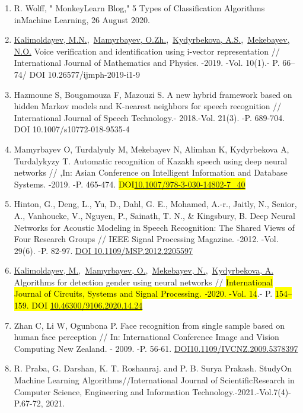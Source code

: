 \begin{enumerate}
\def\labelenumi{\arabic{enumi}.}
\setcounter{enumi}{2}
\item
  R. Wolff, " MonkeyLearn Blog," 5 Types of Classification Algorithms
  inMachine Learning, 26 August 2020.
\item
  \href{https://www.scopus.com/authid/detail.uri?authorId=56153126500}{Kalimoldayev,
  M.N.},~\href{https://www.scopus.com/authid/detail.uri?authorId=55967630400}{Mamyrbayev,
  O.Zh.},~\href{https://www.scopus.com/authid/detail.uri?authorId=57208346238}{Kydyrbekova,
  A.S.},~\href{https://www.scopus.com/authid/detail.uri?authorId=57202316868}{Mekebayev,
  N.O.} Voice verification and identification using i-vector
  representation // International Journal of Mathematics and Physics.
  -2019. -Vol. 10(1).- P. 66--74/ DOI 10.26577/ijmph-2019-i1-9
\item
  Hazmoune S, Bougamouza F, Mazouzi S. A new hybrid framework based on
  hidden Markov models and K-nearest neighbors for speech recognition //
  International Journal of Speech Technology.- 2018.-Vol. 21(3). -P.
  689-704. DOI 10.1007/s10772-018-9535-4
\item
  Mamyrbayev O, Turdalyuly M, Mekebayev N, Alimhan K, Kydyrbekova A,
  Turdalykyzy T. Automatic recognition of Kazakh speech using deep
  neural networks // ,In: Asian Conference on Intelligent Information
  and Database Systems. -2019. -P. 465-474.
  \hl{DOI\href{http://dx.doi.org/10.1007/978-3-030-14802-7_40}{10.1007/978-3-030-14802-7\_40}}
\item
  Hinton, G., Deng, L., Yu, D., Dahl, G. E., Mohamed, A.-r., Jaitly, N.,
  Senior, A., Vanhoucke, V., Nguyen, P., Sainath, T. N., \& Kingsbury,
  B. Deep Neural Networks for Acoustic Modeling in Speech Recognition:
  The Shared Views of Four Research Groups // IEEE Signal Processing
  Magazine. -2012. -Vol. 29(6). -P. 82-97.
  \href{https://doi.org/10.1109/MSP.2012.2205597}{DOI
  10.1109/MSP.2012.2205597}
\item
  \href{https://www.scopus.com/authid/detail.uri?authorId=56153126500}{Kalimoldayev,
  M.},~\href{https://www.scopus.com/authid/detail.uri?authorId=55967630400}{Mamyrbayev,
  O.},~\href{https://www.scopus.com/authid/detail.uri?authorId=57202316868}{Mekebayev,
  N.},~\href{https://www.scopus.com/authid/detail.uri?authorId=57208346238}{Kydyrbekova,
  A.} Algorithms for detection gender using neural networks //
  \hl{International Journal of Circuits, Systems and Signal
  Processing\emph{. -}2020. -Vol. 14}.- P. \hl{154--159. DOI
  \href{https://doi.org/10.46300/9106.2020.14.24}{10.46300/9106.2020.14.24}}
\item
  Zhan C, Li W, Ogunbona P. Face recognition from single sample based on
  human face perception // In: International Conference Image and Vision
  Computing New Zealand. - 2009. -P. 56-61.
  \href{https://doi.org/10.1109/IVCNZ.2009.5378397}{DOI10.1109/IVCNZ.2009.5378397}
\item
  R. Praba, G. Darshan, K. T. Roshanraj. and P. B. Surya Prakash.
  StudyOn Machine Learning Algorithms//International Journal of
  ScientificResearch in Computer Science, Engineering and Information
  Technology.-2021.-Vol.7(4)- P.67-72, 2021.
\end{enumerate}

